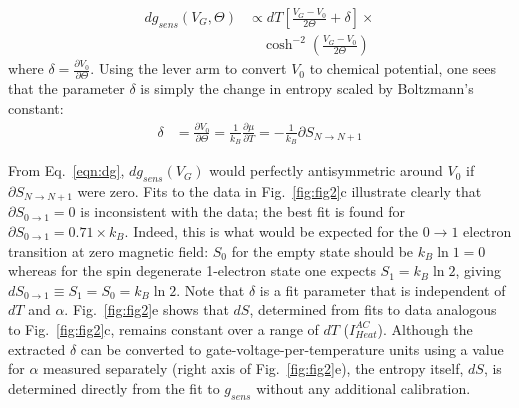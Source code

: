 \documentclass[twocolumn,showpacs,preprintnumbers,amsmath,amssymb,pra,aps,superscriptaddress]{revtex4-1}
\begin{document}

%
\begin{align}
\label{eqn:dg}
        dg_{sens}(V_G, \Theta) &\propto dT \left[ \frac{V_G-V_0}{2\Theta} +\delta \right]\times \\
        				      &\quad\cosh^{-2}\left(\frac{V_G-V_0}{2\Theta}\right) \nonumber
\end{align}
%
where $\delta=\frac{\partial V_0}{\partial \Theta}$. Using the lever arm to convert $V_0$ to chemical potential, one sees that the parameter $\delta$ is simply the change in entropy scaled by Boltzmann's constant:
%
\begin{align}
\label{eqn:delta}
        \delta &= \frac{\partial V_0}{\partial \Theta} = 
        \frac{1}{k_B} \frac{\partial \mu}{\partial T} = 
        -\frac{1}{k_B} \partial S_{N\rightarrow N+1}
\end{align}
%

From Eq.~\ref{eqn:dg}, $dg_{sens}(V_G)$ would perfectly antisymmetric around $V_0$ if $\partial S_{N\rightarrow N+1}$ were zero.  Fits to the data in Fig.~\ref{fig:fig2}c illustrate clearly that $\partial S_{0\rightarrow 1}=0$ is inconsistent with the data;  the best fit is found for $\partial S_{0\rightarrow 1}=0.71\times k_B$.  Indeed, this is what would be expected for the $0 \rightarrow 1$ electron transition at zero magnetic field: $S_0$ for the empty state should be $k_B \ln{1}=0$ whereas for the spin degenerate 1-electron state one expects $S_1=k_B\ln{2}$, giving $dS_{0\rightarrow 1}\equiv S_1 = S_0 =k_B\ln{2}$.%
Note that $\delta$ is a fit parameter that is independent of $dT$ and $\alpha$. Fig.~\ref{fig:fig2}e shows that $dS$,  determined from fits to data analogous to Fig.~\ref{fig:fig2}c, remains constant over a range of $dT$ ($I^{AC}_{Heat}$).  Although the extracted $\delta$ can be converted to gate-voltage-per-temperature units using a value for $\alpha$ measured separately (right axis of Fig.~\ref{fig:fig2}e), the entropy itself, $dS$, is determined directly from the fit to $g_{sens}$ without any additional calibration.
\end{document}
